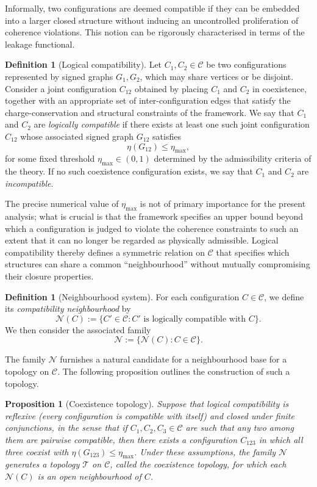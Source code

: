 \documentclass[11pt,a4paper]{article}
\newtheorem{proposition}[theorem]{Proposition}
\theoremstyle{definition}
\newtheorem{definition}[theorem]{Definition}
\newcommand{\Cconf}{\mathcal{C}} %
\begin{document}
Informally, two configurations are deemed compatible if they can be embedded into a larger closed structure without inducing an uncontrolled proliferation of coherence violations. This notion can be rigorously characterised in terms of the leakage functional.

\begin{definition}[Logical compatibility]
Let \(C_1, C_2 \in \Cconf\) be two configurations represented by signed graphs \(G_1, G_2\), which may share vertices or be disjoint. Consider a joint configuration \(C_{12}\) obtained by placing \(C_1\) and \(C_2\) in coexistence, together with an appropriate set of inter-configuration edges that satisfy the charge-conservation and structural constraints of the framework. We say that \(C_1\) and \(C_2\) are \emph{logically compatible} if there exists at least one such joint configuration \(C_{12}\) whose associated signed graph \(G_{12}\) satisfies
\[
 \eta(G_{12}) \leq \eta_{\mathrm{max}},
\]
for some fixed threshold \(\eta_{\mathrm{max}} \in (0,1)\) determined by the admissibility criteria of the theory. If no such coexistence configuration exists, we say that \(C_1\) and \(C_2\) are \emph{incompatible}.
\end{definition}

The precise numerical value of \(\eta_{\mathrm{max}}\) is not of primary importance for the present analysis; what is crucial is that the framework specifies an upper bound beyond which a configuration is judged to violate the coherence constraints to such an extent that it can no longer be regarded as physically admissible. Logical compatibility thereby defines a symmetric relation on \(\Cconf\) that specifies which structures can share a common “neighbourhood” without mutually compromising their closure properties.

\begin{definition}[Neighbourhood system]
For each configuration \(C \in \Cconf\), we define its \emph{compatibility neighbourhood} by
\[
 \mathcal{N}(C) := \{ C' \in \Cconf : C' \text{ is logically compatible with } C \}.
\]
We then consider the associated family
\[
 \mathscr{N} := \{ \mathcal{N}(C) : C \in \Cconf \}.
\]
\end{definition}

The family \(\mathscr{N}\) furnishes a natural candidate for a neighbourhood base for a topology on \(\Cconf\). The following proposition outlines the construction of such a topology.

\begin{proposition}[Coexistence topology]
Suppose that logical compatibility is reflexive (every configuration is compatible with itself) and closed under finite conjunctions, in the sense that if \(C_1, C_2, C_3 \in \Cconf\) are such that any two among them are pairwise compatible, then there exists a configuration \(C_{123}\) in which all three coexist with \(\eta(G_{123}) \leq \eta_{\mathrm{max}}\). Under these assumptions, the family \(\mathscr{N}\) generates a topology \(\mathscr{T}\) on \(\Cconf\), called the \emph{coexistence topology}, for which each \(\mathcal{N}(C)\) is an open neighbourhood of \(C\).
\end{proposition}
\end{document}
